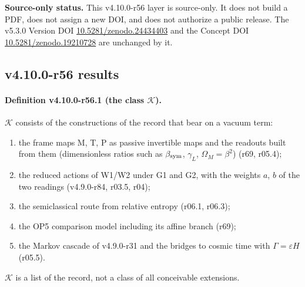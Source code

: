 \noindent\textbf{Source-only status.}
This v4.10.0-r56 layer is source-only.  It does not build a PDF, does not assign a new DOI,
and does not authorize a public release.  The v5.3.0 Version DOI
\href{https://doi.org/10.5281/zenodo.24434403}{10.5281/zenodo.24434403} and the Concept DOI
\href{https://doi.org/10.5281/zenodo.19210728}{10.5281/zenodo.19210728} are unchanged by it.

\subsection*{v4.10.0-r56 results}
\label{subsec:v4100-r56-results}

\paragraph{Definition v4.10.0-r56.1 (the class \(\mathcal K\)).}
\(\mathcal K\) consists of the constructions of the record that bear on a vacuum term:
\begin{enumerate}[leftmargin=2em]
\item[(K1)] the frame maps M, T, P as passive invertible maps and the readouts built from them (dimensionless ratios such as \(\beta_{\rm sym}\), \(\gamma_L\),
\(\Omega_M=\beta^2\)) (r69, r05.4);
\item[(K2)] the reduced actions of W1/W2 under G1 and G2, with the weights \(a\), \(b\) of the two readings (v4.9.0-r84, r03.5, r04);
\item[(K3)] the semiclassical route from relative entropy (r06.1, r06.3);
\item[(K4)] the OP5 comparison model including its affine branch (r69);
\item[(K5)] the Markov cascade of v4.9.0-r31 and the bridges to cosmic time with \(\Gamma=\varepsilon H\) (r05.5).
\end{enumerate}
\(\mathcal K\) is a list of the record, not a class of all conceivable extensions.

